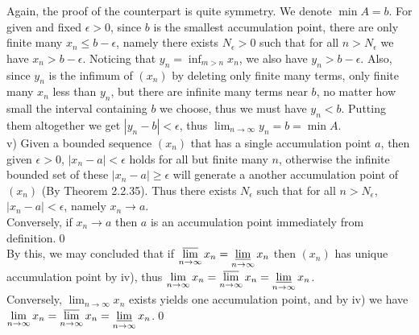 \documentclass[12pt]{article}
\begin{document}
Again, the proof of the counterpart is quite symmetry. We denote $\min{A}=b$. For given and fixed $\epsilon>0$, since $b$ is the smallest accumulation point, there are only finite many $x_n\le b-\epsilon$, namely there exists $N_{\epsilon}>0$ such that for all $n>N_{\epsilon}$ we have $x_n>b-\epsilon$. Noticing that $y_n=\displaystyle\inf_{m>n}x_n$, we also have $y_n>b-\epsilon$. Also, since $y_n$ is the infimum of $(x_n)$ by deleting only finite many terms, only finite many $x_n$ less than $y_n$, but there are infinite many terms near $b$, no matter how small the interval containing $b$ we choose, thus we must have $y_n<b$. Putting them altogether we get $|y_n-b|<\epsilon$, thus $\displaystyle\lim_{n\to\infty}y_n=b=\min{A}$.\\

v) Given a bounded sequence $(x_n)$ that has a single accumulation point $a$, then given $\epsilon>0$, $|x_n-a|<\epsilon$ holds for all but finite many $n$, otherwise the infinite bounded set of these $|x_n-a|\ge\epsilon$ will generate a another  accumulation point of $(x_n)$ (By Theorem 2.2.35). Thus there exists $N_{\epsilon}$ such that for all $n>N_{\epsilon}$, $|x_n-a|<\epsilon$, namely $x_n\to a$. \\
Conversely, if  $x_n\to a$ then $a$ is an accumulation point immediately from definition.\qed\\
By this, we may concluded that if $\displaystyle\varlimsup_{n\to\infty}x_n=\varliminf_{n\to\infty}x_n$ then $(x_n)$ has unique accumulation point by iv), thus $\displaystyle\lim_{n\to\infty}x_n=\varlimsup_{n\to\infty}x_n=\varliminf_{n\to\infty}x_n$. \\
Conversely, $\displaystyle\lim_{n\to\infty}x_n$ exists yields one  accumulation point, and by iv) we have $\displaystyle\lim_{n\to\infty}x_n=\varlimsup_{n\to\infty}x_n=\varliminf_{n\to\infty}x_n$.\qed\\
\end{document}
